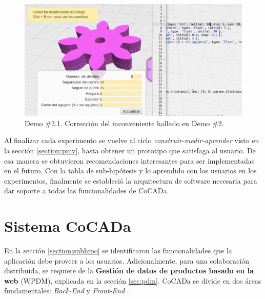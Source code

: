 \begin{figure}[h!]
    \includegraphics[width=14cm]{Img/Desarrollo/feedback003.png}
    \centering
    \caption{\footnotesize{Demo \#2.1. Corrección del inconveniente hallado en Demo \#2.}}
     \label{fig:feedback002}
    \end{figure}

\vspace{5mm}

Al finalizar cada experimento se vuelve al ciclo \textit{construir-medir-aprender} visto en la sección \ref{section:pmv}, hasta obtener un prototipo que satisfaga al usuario. De esa manera se obtuvieron recomendaciones interesantes para ser implementadas en el futuro. %
Con la tabla de sub-hipótesis y lo aprendido con los usuarios en los experimentos, finalmente se estableció la arquitectura de software necesaria para dar soporte a todas las funcionalidades de CoCADa.

\section{Sistema CoCADa}
\label{sistema-cocada}

En la sección \ref{section:subhipo} se identificaron las  funcionalidades que la aplicación debe proveer a los usuarios. Adicionalmente, para una colaboración distribuida, se requiere de la \textbf{Gestión de datos de productos basado en la web} (WPDM), explicada en la sección \ref{sec:pdm}. CoCADa se divide en dos áreas fundamentales: \textit{\Gls{Back-End}} y \textit{\Gls{Front-End}} \citep{mardan2015full}.



